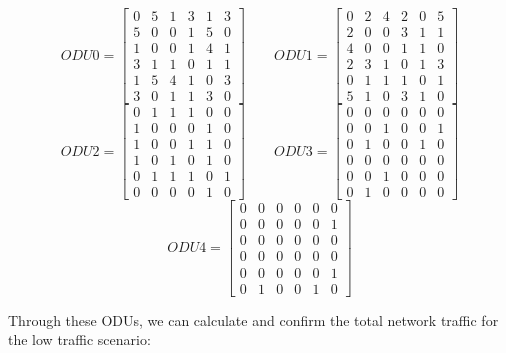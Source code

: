 \[
ODU0=
  \begin{bmatrix}
    0 & 5 & 1 & 3 & 1 & 3 \\
    5 & 0 & 0 & 1 & 5 & 0 \\
    1 & 0 & 0 & 1 & 4 & 1 \\
    3 & 1 & 1 & 0 & 1 & 1 \\
    1 & 5 & 4 & 1 & 0 & 3 \\
    3 & 0 & 1 & 1 & 3 & 0
  \end{bmatrix}
\qquad ODU1=
  \begin{bmatrix}
    0 & 2 & 4 & 2 & 0 & 5 \\
    2 & 0 & 0 & 3 & 1 & 1 \\
    4 & 0 & 0 & 1 & 1 & 0 \\
    2 & 3 & 1 & 0 & 1 & 3 \\
    0 & 1 & 1 & 1 & 0 & 1 \\
    5 & 1 & 0 & 3 & 1 & 0
  \end{bmatrix}
\]
\[
ODU2=
  \begin{bmatrix}
    0 & 1 & 1 & 1 & 0 & 0 \\
    1 & 0 & 0 & 0 & 1 & 0 \\
    1 & 0 & 0 & 1 & 1 & 0 \\
    1 & 0 & 1 & 0 & 1 & 0 \\
    0 & 1 & 1 & 1 & 0 & 1 \\
    0 & 0 & 0 & 0 & 1 & 0
  \end{bmatrix}
\qquad ODU3=
  \begin{bmatrix}
    0 & 0 & 0 & 0 & 0 & 0 \\
    0 & 0 & 1 & 0 & 0 & 1 \\
    0 & 1 & 0 & 0 & 1 & 0 \\
    0 & 0 & 0 & 0 & 0 & 0 \\
    0 & 0 & 1 & 0 & 0 & 0 \\
    0 & 1 & 0 & 0 & 0 & 0
  \end{bmatrix}
\]
\[
ODU4=
  \begin{bmatrix}
    0 & 0 & 0 & 0 & 0 & 0 \\
    0 & 0 & 0 & 0 & 0 & 1 \\
    0 & 0 & 0 & 0 & 0 & 0 \\
    0 & 0 & 0 & 0 & 0 & 0 \\
    0 & 0 & 0 & 0 & 0 & 1 \\
    0 & 1 & 0 & 0 & 1 & 0
  \end{bmatrix}
\]

Through these ODUs, we can calculate and confirm the total network traffic for the low traffic scenario: \\

